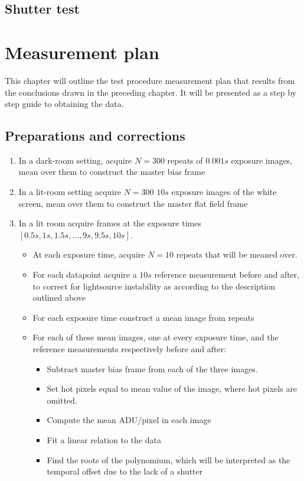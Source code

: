 \documentclass[../main.tex]{subfiles}
\begin{document}
		\subsection{Shutter test}
		
		\section{Measurement plan}
		This chapter will outline the test procedure measurement plan that results from the conclusions drawn in the preceding chapter. It will be presented as a step by step guide to obtaining the data. 
		
		\subsection{Preparations and corrections}
		\begin{enumerate}
			\item In a dark-room setting, acquire $N=300$ repeats of $0.001s$ exposure images, mean over them to construct the master bias frame
			\item In a lit-room setting acquire $N=300$ $10s$ exposure images of the white screen, mean over them to construct the master flat field frame
			\item In a lit room acquire frames at the exposure times $[0.5s, 1s, 1.5s, \dots, 9s, 9.5s, 10s]$.
			\begin{itemize}
				\item At each exposure time, acquire $N = 10$ repeats that will be meaned over.
				\item For each datapoint acquire a $10s$ reference measurement before and after, to correct for lightsource instability as according to the description outlined above
				\item For each exposure time construct a mean image from repeats
				\item For each of these mean images, one at every exposure time, and the reference measurements respectively before and after:
				\begin{itemize}
					\item Subtract master bias frame from each of the three images.
					\item Set hot pixels equal to mean value of the image, where hot pixels are omitted.
					\item Compute the mean ADU/pixel in each image
					\item Fit a linear relation to the data
					\item Find the roots of the polynomium, which will be interpreted as the temporal offset due to the lack of a shutter
				\end{itemize}
			\end{itemize}
		\end{enumerate}
		
\end{document}
